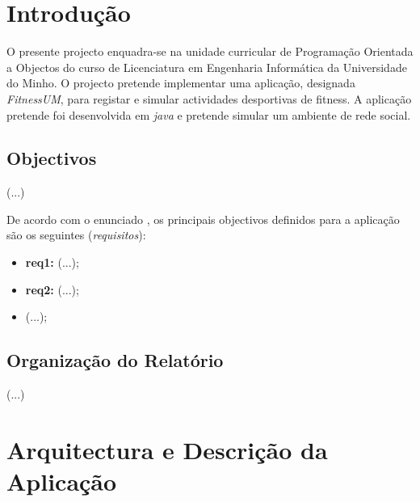 \documentclass[a4paper,10pt]{report}
\begin{document}

\newpage
\phantom{placeholder} %
\thispagestyle{empty} %
\tableofcontents
\phantom{placeholder} %
\thispagestyle{empty} %
\newpage
\phantom{placeholder} %
\thispagestyle{empty} %
\pagestyle{fancy}
\setlength{\headheight}{15.2pt}
\fancyhf{} %
\fancyfoot[LE,RO]{\thepage}
\setcounter{page}{0}

\chapter{Introdução}
\label{cap:intro}
O presente projecto enquadra-se na unidade curricular de Programação Orientada a Objectos do curso de Licenciatura em Engenharia 
Informática da Universidade do Minho.
O projecto pretende implementar uma aplicação, designada \emph{FitnessUM}, para registar e simular actividades desportivas de fitness.
A aplicação pretende foi desenvolvida em \emph{java} e pretende simular um ambiente de rede social.

\section{Objectivos}
\label{sec:obj}
(...)

De acordo com o enunciado \cite{enunciado}, os principais objectivos definidos para a aplicação são os seguintes (\emph{requisitos}):
\begin{itemize}
\item \textbf{req1:} (...);
\item \textbf{req2:} (...); 
\item (...); 
\end{itemize}

\section{Organização do Relatório}
\label{sec:org}
(...)

\chapter{Arquitectura e Descrição da Aplicação}
\label{cap:arq}
\end{document}
